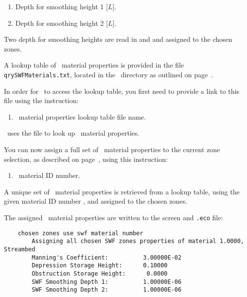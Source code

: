     {
        \squish
        \begin{enumerate}
        \item {}  Depth for smoothing height 1 [$L$].
        \item {}  Depth for smoothing height 2 [$L$].
        \end{enumerate}
          Two depth for smoothing heights are read in  and  and assigned to the chosen zones.
    }

A lookup table of \swf\ material properties  is provided in the file \texttt{qrySWFMaterials.txt}, located in the \bin\ directory as outlined on page~\pageref{page:userbin}.

In order for \mut\ to access the lookup table, you first need to provide a link to this file using the instruction:

    {
        \squish
        \begin{enumerate}
        \item {}  \swf\ material properties lookup table file name.
        \end{enumerate}
          \mut\ uses the file  to look up \swf\ material properties.
    }

You can now assign a full set of \swf\ material properties to the current zone selection, as described on page~\pageref{page:zoneSelect}, using this instruction:

    {
        \squish
        \begin{enumerate}
        \item {}  \swf\ material ID number.
        \end{enumerate}
          A unique set of \swf\ material properties is retrieved from a lookup table, using the given  material ID number , and assigned to the chosen zones.
    }

The assigned \swf\ material properties are written to the screen and \texttt{.eco} file:
\begin{verbatim}
    chosen zones use swf material number
    	Assigning all chosen SWF zones properties of material 1.0000, Streambed
    	Manning's Coefficient:          3.00000E-02
    	Depression Storage Height:      0.10000
    	Obstruction Storage Height:      0.0000
    	SWF Smoothing Depth 1:          1.00000E-06
    	SWF Smoothing Depth 2:          1.00000E-06
\end{verbatim}

